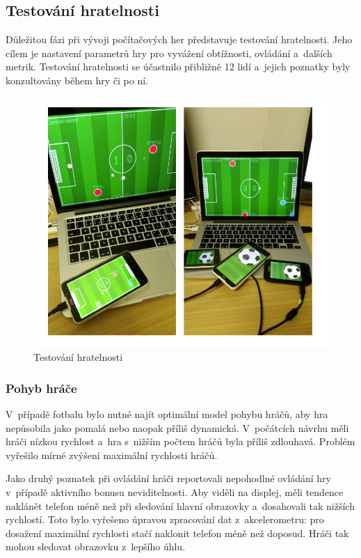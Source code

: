 \documentclass[thesis=B,czech,hidelinks]{FITthesis}[2012/06/26] %
\begin{document}
\subsection{Testování hratelnosti}

Důležitou fázi při vývoji počítačových her představuje testování hratelnosti. Jeho cílem je nastavení parametrů hry pro vyvážení obtížnosti, ovládání a~dalších metrik. Testování hratelnosti se účastnilo přibližně 12 lidí a~jejich poznatky byly konzultovány během hry či po ní.

\begin{figure}[h]
\center
\includegraphics[width=\textwidth]{testing}
\caption{Testování hratelnosti}
\label{picture:testing}
\end{figure}

\subsubsection{Pohyb hráče}

V~případě fotbalu bylo nutné najít optimální model pohybu hráčů, aby hra nepůsobila jako pomalá nebo naopak příliš dynamická. V~počátcích návrhu měli hráči nízkou rychlost a~hra s~nižším počtem hráčů byla příliš zdlouhavá. Problém vyřešilo mírné zvýšení maximální rychlosti hráčů.

Jako druhý poznatek při ovládání hráči reportovali nepohodlné ovládání hry v~případě aktivního bonusu neviditelnosti. Aby viděli na displej, měli tendence naklánět telefon méně než při sledování hlavní obrazovky a~dosahovali tak nižších rychlostí. Toto bylo vyřešeno úpravou zpracování dat z~akcelerometru: pro dosažení maximální rychlosti stačí naklonit telefon méně než doposud. Hráči tak mohou sledovat obrazovku z~lepšího úhlu.
\end{document}
